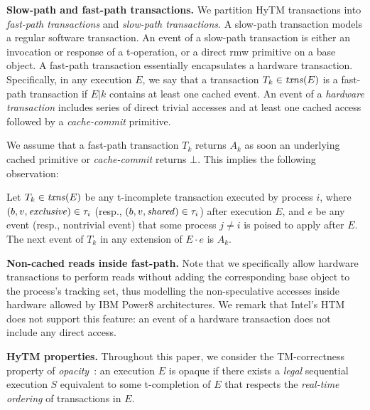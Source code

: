 \vspace{1mm}\noindent\textbf{Slow-path and fast-path transactions.}
We partition HyTM transactions into \emph{fast-path transactions} and \emph{slow-path transactions}.
A slow-path transaction models a regular software transaction.
An event of a slow-path transaction is either an invocation or response of a t-operation, or
a direct rmw primitive on a base object. 
A fast-path transaction essentially encapsulates a hardware transaction. Specifically, in any execution $E$,
we say that a transaction $T_k\in \ms{txns}(E)$ is a fast-path transaction if $E|k$ contains at least one cached event.
An event of a \emph{hardware transaction} includes series of direct trivial accesses and at least one cached access
followed by a \emph{cache-commit} primitive.

We assume that a fast-path transaction $T_k$ returns $A_k$
as soon an underlying cached primitive or \emph{cache-commit} returns $\bot$.
This implies the following observation:
%
\begin{observation}
\label{ob:traborts}
%
Let $T_k \in \ms{txns}(E)$ be any t-incomplete transaction executed by process $i$, where $(b,v,\mathit{exclusive})\in\tau_i$ (resp., $(b,v,\mathit{shared})\in\tau_i$) after execution $E$, and $e$ be any event (resp., nontrivial event) that some process $j\neq i$ is poised to apply after $E$.
The next event of $T_k$ in any extension of $E\cdot e$ is $A_k$.
%
\end{observation}
%
\vspace{1mm}\noindent\textbf{Non-cached reads inside fast-path.}
Note that we specifically allow hardware transactions to perform reads without adding the corresponding base object to
the process's tracking set, thus modelling the non-speculative accesses inside hardware allowed by 
IBM Power8 architectures. We remark that Intel's HTM does not support this feature: an event of a hardware transaction
does not include any direct access.

%
\vspace{1mm}\noindent\textbf{HyTM properties.}
Throughout this paper, we consider the TM-correctness property of \emph{opacity}~\cite{tm-book}: an execution
$E$ is opaque if there exists a \emph{legal} sequential execution $S$ equivalent to some t-completion of $E$
that respects the \emph{real-time ordering} of transactions in $E$.

